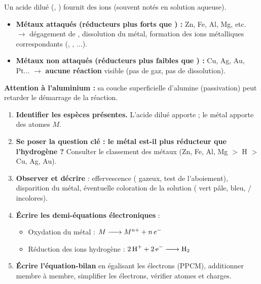 \documentclass[11pt]{article}
\begin{document}
\begin{aretenir}
Un acide dilué (, ) fournit des ions  (souvent notés  en solution aqueuse).
\begin{itemize}
\item \textbf{Métaux attaqués (réducteurs plus forts que ) :} Zn, Fe, Al, Mg, etc. $\rightarrow$ dégagement de , dissolution du métal, formation des ions métalliques correspondants (, , ...).
\item \textbf{Métaux non attaqués (réducteurs plus faibles que ) :} Cu, Ag, Au, Pt... $\rightarrow$ \textbf{aucune réaction} visible (pas de gaz, pas de dissolution).
\end{itemize}
\textbf{Attention à l'aluminium :} sa couche superficielle d'alumine  (passivation) peut retarder le démarrage de la réaction.
\end{aretenir}

\begin{methode}
\begin{enumerate}
\item \textbf{Identifier les espèces présentes.} L'acide dilué apporte  ; le métal apporte des atomes $M$.
\item \textbf{Se poser la question clé : le métal est-il plus réducteur que l'hydrogène ?} Consulter le classement des métaux (Zn, Fe, Al, Mg $>$ H $>$ Cu, Ag, Au).
\item \textbf{Observer et décrire} : effervescence ( gazeux, test de l'aboiement), disparition du métal, éventuelle coloration de la solution ( vert pâle,  bleu, / incolores).
\item \textbf{Écrire les demi-équations électroniques} :
      \begin{itemize}
      \item Oxydation du métal : $M \ce{->} M^{n+} + n\,e^-$
      \item Réduction des ions hydrogène : $\ce{2H+ + 2e- -> H2}$
      \end{itemize}
\item \textbf{Écrire l'équation-bilan} en égalisant les électrons (PPCM), additionner membre à membre, simplifier les électrons, vérifier atomes et charges.
\end{enumerate}
\end{methode}
\end{document}
